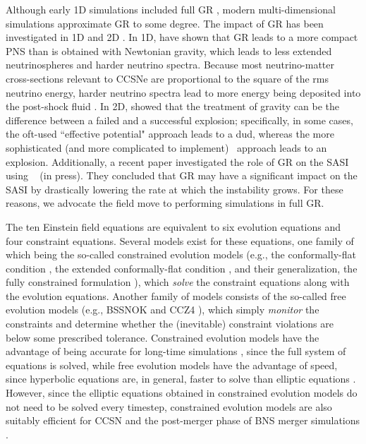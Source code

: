 Although early 1D simulations included full GR
\citep[e.g.,][]{mw1966}, modern multi-dimensional simulations approximate
GR to some degree.
The impact of GR has been investigated in 1D \citep{bdm2001,lmm2012}
and 2D \citep{mjm2012,oc2018}.
In 1D, \citet{bdm2001} have shown that GR leads to a more compact PNS than is
obtained with Newtonian gravity, which leads to less extended neutrinospheres
and harder neutrino spectra.
Because most neutrino-matter cross-sections relevant to CCSNe are proportional to
the square of the rms neutrino energy, harder neutrino spectra lead to more
energy being deposited into the post-shock fluid .
In 2D, \citet{mjm2012} showed that the treatment of gravity
can be the difference between a failed and a successful explosion;
specifically, in some cases, the oft-used
``effective potential" approach \citep{mdj2006} leads to a dud, whereas
the more sophisticated (and more complicated to implement) \xcfc\ approach
leads to an explosion.
Additionally, a recent paper investigated the role of GR on the SASI
using \thornado\ \citep{dem2023} (in press).
They concluded that GR may have a significant impact on the SASI by drastically
lowering the rate at which the instability grows.
For these reasons, we advocate the field move to performing simulations
in full GR.

The ten Einstein field equations are equivalent to six evolution equations and
four constraint equations.
Several models exist for these equations, one family of which being the
so-called constrained evolution models
(e.g., the conformally-flat condition \citep{wmm1996},
the extended conformally-flat condition \citep{ccd2009},
and their generalization, the fully constrained formulation \citep{bgg2004}),
which \emph{solve} the constraint equations along with the evolution equations.
Another family of models consists of the so-called free evolution
models (e.g., BSSNOK \citep{nok1987,sn1995,bs1998} and CCZ4 \citep{blp2003}),
which simply \emph{monitor} the constraints and determine whether the
(inevitable) constraint violations are below some prescribed tolerance.
Constrained evolution models have the advantage of being accurate for long-time
simulations \citep{br2017},
since the full system of equations is solved, while free evolution
models have the advantage of speed, since hyperbolic equations are, in general,
faster to solve than elliptic equations \citep{rz2013}.
However, since the elliptic equations obtained in constrained evolution models
do not need to be solved every timestep, constrained evolution models are also
suitably efficient for CCSN and the post-merger phase of BNS merger simulations
\citep[e.g., see][]{hjm2023}.

